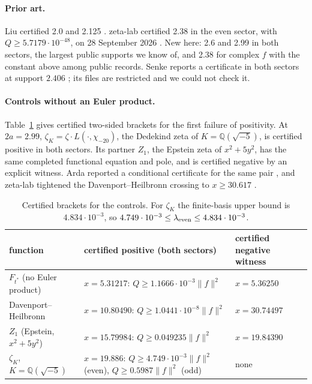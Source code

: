 \documentclass[11pt]{article}
\theoremstyle{remark}
\begin{document}
\paragraph{Prior art.} Liu certified 2.0 and 2.125 \cite{liu26}. zeta-lab certified 2.38 in the even sector, with $Q\ge5.7179\cdot10^{-48}$, on 28 September 2026 \cite{zetalab258}. New here: 2.6 and 2.99 in both sectors, the largest public supports we know of, and 2.38 for complex $f$ with the constant above among public records. Senke reports a certificate in both sectors at support $2.406$ \cite{senke26}; its files are restricted and we could not check it.

\paragraph{Controls without an Euler product.} Table~\ref{tab:controls} gives certified two-sided brackets for the first failure of positivity. At $2a=2.99$, $\zeta_K=\zeta\cdot L(\cdot,\chi_{-20})$, the Dedekind zeta of $K=\mathbb Q(\sqrt{-5})$, is certified positive in both sectors. Its partner $Z_1$, the Epstein zeta of $x^2+5y^2$, has the same completed functional equation and pole, and is certified negative by an explicit witness. Arda reported a conditional certificate for the same pair \cite{arda631}, and zeta-lab tightened the Davenport--Heilbronn crossing to $x\ge30.617$ \cite{zetalab253}.

\begin{table}[h]
\centering\small
\begin{tabular}{@{}p{3.6cm}p{6.6cm}p{3.6cm}@{}}
\toprule
function & certified positive (both sectors) & certified negative witness\\
\midrule
$F_{t^*}$ (no Euler product) & $x=5.31217$: $Q\ge1.1666\cdot10^{-3}\|f\|^2$ & $x=5.36250$\\
Davenport--Heilbronn & $x=10.80490$: $Q\ge1.0441\cdot10^{-8}\|f\|^2$ & $x=30.74497$\\
$Z_1$ (Epstein, $x^2+5y^2$) & $x=15.79984$: $Q\ge0.049235\|f\|^2$ & $x=19.84390$\\
$\zeta_K$, $K=\mathbb Q(\sqrt{-5})$ & $x=19.886$: $Q\ge4.749\cdot10^{-3}\|f\|^2$ (even), $Q\ge0.5987\|f\|^2$ (odd) & none\\
\bottomrule
\end{tabular}
\caption{Certified brackets for the controls. For $\zeta_K$ the finite-basis upper bound is $4.834\cdot10^{-3}$, so $4.749\cdot10^{-3}\le\lambda_{\rm even}\le4.834\cdot10^{-3}$.}\label{tab:controls}
\end{table}
\end{document}

